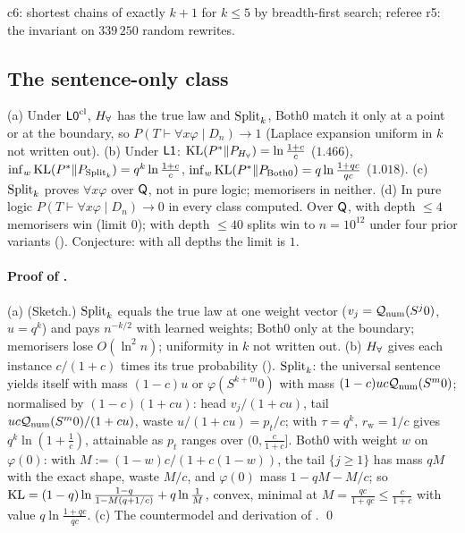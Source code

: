 c6: shortest chains of exactly $k+1$ for $k\le5$ by breadth-first search; referee r5: the invariant on $339\,250$ random rewrites.

\subsection{The sentence-only class}\label{app:univ:sentences}

\begin{proposition}\label{prop:univ:sentences}
\textup{(a)}  Under $\mathord{\mathsf{L0}}^{\mathrm{cl}}$, $H_{\forall}$ has the true law and $\mathrm{Split}_k$, Both0 match it only at a point or at the boundary, so $P(T\vdash\forall x\varphi\mid D_n)\to1$ (Laplace expansion uniform in $k$ not written out). \textup{(b)} Under $\mathord{\mathsf{L1}}$: $\mathrm{KL}(P^*\|P_{H_{\forall}})=\ln\frac{1+c}c$ ($1.466$), $\inf_w\mathrm{KL}(P^*\|P_{\mathrm{Split}_k})=q^k\ln\frac{1+c}c$, $\inf_w\mathrm{KL}(P^*\|P_{\mathrm{Both0}})=q\ln\frac{1+qc}{qc}$ ($1.018$). \textup{(c)} $\mathrm{Split}_k$ proves $\forall x\varphi$ over $\mathsf{Q}$, not in pure logic; memorisers in neither. \textup{(d)}  In pure logic $P(T\vdash\forall x\varphi\mid D_n)\to0$ in every class computed. Over $\mathsf{Q}$, with depth $\le4$ memorisers win (limit $0$); with depth $\le40$ splits win to $n=10^{12}$ under four prior variants (). Conjecture: with all depths the limit is $1$.
\end{proposition}

\paragraph{Proof of .} (a) (Sketch.) $\mathrm{Split}_k$ equals the true law at one weight vector ($v_j=\mathcal{Q}_{\mathrm{num}}(S^j0)$, $u=q^k$) and pays $n^{-k/2}$ with learned weights; Both0 only at the boundary; memorisers lose $O(\ln^2n)$; uniformity in $k$ not written out. (b) $H_{\forall}$ gives each instance $c/(1+c)$ times its true probability (). $\mathrm{Split}_k$: the universal sentence yields itself with mass $(1-c)u$ or $\varphi(S^{k+m}0)$ with mass $(1-c)uc\mathcal{Q}_{\mathrm{num}}(S^m0)$; normalised by $(1-c)(1+cu)$: head $v_j/(1+cu)$, tail $uc\mathcal{Q}_{\mathrm{num}}(S^m0)/(1+cu)$, waste $u/(1+cu)=p_t/c$;  with $\tau=q^k$, $r_{\mathrm w}=1/c$ gives $q^k\ln(1+\frac1c)$, attainable as $p_t$ ranges over $(0,\frac c{1+c}]$. Both0 with weight $w$ on $\varphi(0)$: with $M:=(1-w)c/(1+c(1-w))$, the tail $\{j\ge1\}$ has mass $qM$ with the exact shape, waste $M/c$, and $\varphi(0)$ mass $1-qM-M/c$; so $\mathrm{KL}=(1-q)\ln\frac{1-q}{1-M(q+1/c)}+q\ln\frac1M$, convex, minimal at $M=\frac{qc}{1+qc}\le\frac c{1+c}$ with value $q\ln\frac{1+qc}{qc}$. (c) The countermodel and derivation of . \qed

